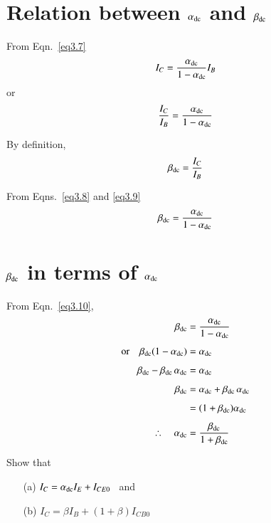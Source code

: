 \section[Relation between $\alpha_{\dc}$ and $\beta_{\dc}$]{Relation between \boldmath$\alpha_{\dc}$ and $\beta_{\dc}$}\label{sec3.11}

From Eqn.~\eqref{eq3.7}
$$
I_{C}=\frac{\alpha_{\operatorname{dc}}}{1-\alpha_{\operatorname{dc}}}I_{B}
$$
or
\begin{equation}
\frac{I_{C}}{I_{B}}=\dfrac{\alpha_{\operatorname{dc}}}{1-\alpha_{\operatorname{dc}}}\label{eq3.8}
\end{equation}

By definition,
\begin{equation}
\beta_{\operatorname{dc}}=\dfrac{I_{C}}{I_{B}}\label{eq3.9}
\end{equation}

From Eqns.~\eqref{eq3.8} and \eqref{eq3.9}
\begin{equation}
\beta_{\operatorname{dc}}=\dfrac{\alpha_{\operatorname{dc}}}{1-\alpha_{\operatorname{dc}}}\label{eq3.10}
\end{equation}

\eject

\section[$\beta_{\dc}$ in terms of $\alpha_{\dc}$]{\boldmath$\beta_{\dc}$ in terms of $\alpha_{\dc}$}\label{sec3.12}

From Eqn.~\eqref{eq3.10},
\begin{align}
\beta_{\operatorname{dc}} &= \frac{\alpha_{\operatorname{dc}}}{1-\alpha_{\operatorname{dc}}}\notag\\[4pt]
\text{or}\quad \beta_{\operatorname{dc}}(1-\alpha_{\operatorname{dc}}) &= \alpha_{\operatorname{dc}}\notag\\[4pt]
\beta_{\operatorname{dc}}-\beta_{\operatorname{dc}}\,\alpha_{\operatorname{dc}} &= \alpha_{\operatorname{dc}}\notag\\[4pt]
\beta_{\operatorname{dc}} &= \alpha_{\operatorname{dc}}+\beta_{\operatorname{dc}}\,\alpha_{\operatorname{dc}}\notag\\[4pt]
&= (1+\beta_{\operatorname{dc}})\alpha_{\operatorname{dc}}\notag\\[4pt]
\therefore\quad \alpha_{\operatorname{dc}} &= \frac{\beta_{\operatorname{dc}}}{1+\beta_{\operatorname{dc}}}\label{eq3.11}
\end{align}

\begin{example}\label{add3.1}
Show that
\begin{itemize}
\item[(a)] $I_{C}=\alpha_{\operatorname{dc}}I_{E}+I_{CE0}$ \ and

\item[(b)] $I_{C}=\beta I_{B}+(1+\beta)I_{CB0}$
\end{itemize}
\end{example}

